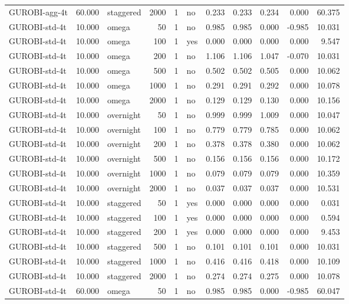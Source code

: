 \begin{table}[htbp]
\begin{tabular}{lrlrrlrrrrr}
GUROBI-agg-4t & 60.000 & staggered & 2000 & 1 & no & 0.233 & 0.233 & 0.234 & 0.000 & 60.375 \\
GUROBI-std-4t & 10.000 & omega & 50 & 1 & no & 0.985 & 0.985 & 0.000 & -0.985 & 10.031 \\
GUROBI-std-4t & 10.000 & omega & 100 & 1 & yes & 0.000 & 0.000 & 0.000 & 0.000 & 9.547 \\
GUROBI-std-4t & 10.000 & omega & 200 & 1 & no & 1.106 & 1.106 & 1.047 & -0.070 & 10.031 \\
GUROBI-std-4t & 10.000 & omega & 500 & 1 & no & 0.502 & 0.502 & 0.505 & 0.000 & 10.062 \\
GUROBI-std-4t & 10.000 & omega & 1000 & 1 & no & 0.291 & 0.291 & 0.292 & 0.000 & 10.078 \\
GUROBI-std-4t & 10.000 & omega & 2000 & 1 & no & 0.129 & 0.129 & 0.130 & 0.000 & 10.156 \\
GUROBI-std-4t & 10.000 & overnight & 50 & 1 & no & 0.999 & 0.999 & 1.009 & 0.000 & 10.047 \\
GUROBI-std-4t & 10.000 & overnight & 100 & 1 & no & 0.779 & 0.779 & 0.785 & 0.000 & 10.062 \\
GUROBI-std-4t & 10.000 & overnight & 200 & 1 & no & 0.378 & 0.378 & 0.380 & 0.000 & 10.062 \\
GUROBI-std-4t & 10.000 & overnight & 500 & 1 & no & 0.156 & 0.156 & 0.156 & 0.000 & 10.172 \\
GUROBI-std-4t & 10.000 & overnight & 1000 & 1 & no & 0.079 & 0.079 & 0.079 & 0.000 & 10.359 \\
GUROBI-std-4t & 10.000 & overnight & 2000 & 1 & no & 0.037 & 0.037 & 0.037 & 0.000 & 10.531 \\
GUROBI-std-4t & 10.000 & staggered & 50 & 1 & yes & 0.000 & 0.000 & 0.000 & 0.000 & 0.031 \\
GUROBI-std-4t & 10.000 & staggered & 100 & 1 & yes & 0.000 & 0.000 & 0.000 & 0.000 & 0.594 \\
GUROBI-std-4t & 10.000 & staggered & 200 & 1 & yes & 0.000 & 0.000 & 0.000 & 0.000 & 9.453 \\
GUROBI-std-4t & 10.000 & staggered & 500 & 1 & no & 0.101 & 0.101 & 0.101 & 0.000 & 10.031 \\
GUROBI-std-4t & 10.000 & staggered & 1000 & 1 & no & 0.416 & 0.416 & 0.418 & 0.000 & 10.109 \\
GUROBI-std-4t & 10.000 & staggered & 2000 & 1 & no & 0.274 & 0.274 & 0.275 & 0.000 & 10.078 \\
GUROBI-std-4t & 60.000 & omega & 50 & 1 & no & 0.985 & 0.985 & 0.000 & -0.985 & 60.047 \\

\end{tabular}
\end{table}

